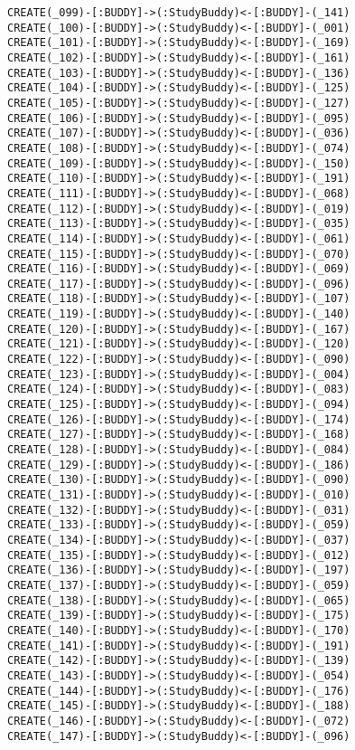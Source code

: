 \begin{lstlisting}
CREATE(_099)-[:BUDDY]->(:StudyBuddy)<-[:BUDDY]-(_141)
CREATE(_100)-[:BUDDY]->(:StudyBuddy)<-[:BUDDY]-(_001)
CREATE(_101)-[:BUDDY]->(:StudyBuddy)<-[:BUDDY]-(_169)
CREATE(_102)-[:BUDDY]->(:StudyBuddy)<-[:BUDDY]-(_161)
CREATE(_103)-[:BUDDY]->(:StudyBuddy)<-[:BUDDY]-(_136)
CREATE(_104)-[:BUDDY]->(:StudyBuddy)<-[:BUDDY]-(_125)
CREATE(_105)-[:BUDDY]->(:StudyBuddy)<-[:BUDDY]-(_127)
CREATE(_106)-[:BUDDY]->(:StudyBuddy)<-[:BUDDY]-(_095)
CREATE(_107)-[:BUDDY]->(:StudyBuddy)<-[:BUDDY]-(_036)
CREATE(_108)-[:BUDDY]->(:StudyBuddy)<-[:BUDDY]-(_074)
CREATE(_109)-[:BUDDY]->(:StudyBuddy)<-[:BUDDY]-(_150)
CREATE(_110)-[:BUDDY]->(:StudyBuddy)<-[:BUDDY]-(_191)
CREATE(_111)-[:BUDDY]->(:StudyBuddy)<-[:BUDDY]-(_068)
CREATE(_112)-[:BUDDY]->(:StudyBuddy)<-[:BUDDY]-(_019)
CREATE(_113)-[:BUDDY]->(:StudyBuddy)<-[:BUDDY]-(_035)
CREATE(_114)-[:BUDDY]->(:StudyBuddy)<-[:BUDDY]-(_061)
CREATE(_115)-[:BUDDY]->(:StudyBuddy)<-[:BUDDY]-(_070)
CREATE(_116)-[:BUDDY]->(:StudyBuddy)<-[:BUDDY]-(_069)
CREATE(_117)-[:BUDDY]->(:StudyBuddy)<-[:BUDDY]-(_096)
CREATE(_118)-[:BUDDY]->(:StudyBuddy)<-[:BUDDY]-(_107)
CREATE(_119)-[:BUDDY]->(:StudyBuddy)<-[:BUDDY]-(_140)
CREATE(_120)-[:BUDDY]->(:StudyBuddy)<-[:BUDDY]-(_167)
CREATE(_121)-[:BUDDY]->(:StudyBuddy)<-[:BUDDY]-(_120)
CREATE(_122)-[:BUDDY]->(:StudyBuddy)<-[:BUDDY]-(_090)
CREATE(_123)-[:BUDDY]->(:StudyBuddy)<-[:BUDDY]-(_004)
CREATE(_124)-[:BUDDY]->(:StudyBuddy)<-[:BUDDY]-(_083)
CREATE(_125)-[:BUDDY]->(:StudyBuddy)<-[:BUDDY]-(_094)
CREATE(_126)-[:BUDDY]->(:StudyBuddy)<-[:BUDDY]-(_174)
CREATE(_127)-[:BUDDY]->(:StudyBuddy)<-[:BUDDY]-(_168)
CREATE(_128)-[:BUDDY]->(:StudyBuddy)<-[:BUDDY]-(_084)
CREATE(_129)-[:BUDDY]->(:StudyBuddy)<-[:BUDDY]-(_186)
CREATE(_130)-[:BUDDY]->(:StudyBuddy)<-[:BUDDY]-(_090)
CREATE(_131)-[:BUDDY]->(:StudyBuddy)<-[:BUDDY]-(_010)
CREATE(_132)-[:BUDDY]->(:StudyBuddy)<-[:BUDDY]-(_031)
CREATE(_133)-[:BUDDY]->(:StudyBuddy)<-[:BUDDY]-(_059)
CREATE(_134)-[:BUDDY]->(:StudyBuddy)<-[:BUDDY]-(_037)
CREATE(_135)-[:BUDDY]->(:StudyBuddy)<-[:BUDDY]-(_012)
CREATE(_136)-[:BUDDY]->(:StudyBuddy)<-[:BUDDY]-(_197)
CREATE(_137)-[:BUDDY]->(:StudyBuddy)<-[:BUDDY]-(_059)
CREATE(_138)-[:BUDDY]->(:StudyBuddy)<-[:BUDDY]-(_065)
CREATE(_139)-[:BUDDY]->(:StudyBuddy)<-[:BUDDY]-(_175)
CREATE(_140)-[:BUDDY]->(:StudyBuddy)<-[:BUDDY]-(_170)
CREATE(_141)-[:BUDDY]->(:StudyBuddy)<-[:BUDDY]-(_191)
CREATE(_142)-[:BUDDY]->(:StudyBuddy)<-[:BUDDY]-(_139)
CREATE(_143)-[:BUDDY]->(:StudyBuddy)<-[:BUDDY]-(_054)
CREATE(_144)-[:BUDDY]->(:StudyBuddy)<-[:BUDDY]-(_176)
CREATE(_145)-[:BUDDY]->(:StudyBuddy)<-[:BUDDY]-(_188)
CREATE(_146)-[:BUDDY]->(:StudyBuddy)<-[:BUDDY]-(_072)
CREATE(_147)-[:BUDDY]->(:StudyBuddy)<-[:BUDDY]-(_096)

\end{lstlisting}
